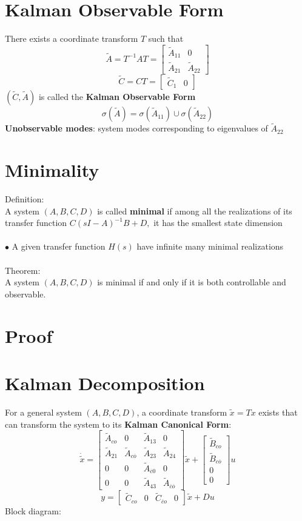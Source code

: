 \documentclass[10pt,a4paper,oneside]{article}
\begin{document}
\section{Kalman Observable Form}
There exists a coordinate transform $T$ such that
\[
\tilde{A}=T^{-1} A T=\left[\begin{array}{cc}{\tilde{A}_{11}} & {0} \\ {\tilde{A}_{21}} & {\tilde{A}_{22}}\end{array}\right]
\]
\[
\tilde{C}={C T}=\left[\begin{array}{ll}{\tilde{C}_{1}} & {0}\end{array}\right]
\]
$(\tilde{C}, \tilde{A})$ is called the {\bfseries Kalman Observable Form}
\[
\sigma(\tilde{A})=\sigma(\tilde{A}_{11}) \cup \sigma(\tilde{A}_{22})
\]
{\bfseries Unobservable modes}: system modes corresponding to eigenvalues of $\tilde{A}_{22}$
\section{Minimality}
Definition:\\
A system $(A,B,C,D)$ is called {\bfseries minimal} if among all the realizations of its transfer function $C(sI-A)^{-1} B+D,$ it has the smallest state dimension\\
\\$\bullet$ A given transfer function $H(s)$ have infinite many minimal realizations\\
\\Theorem:\\
A system $(A,B,C,D)$ is minimal if and only if it is both controllable and observable.
\section{Proof}
\section{Kalman Decomposition}
For a general system $(A,B,C,D)$, a coordinate transform $\tilde{x}=Tx$ exists that can transform the system to its {\bfseries Kalman Canonical Form}:
\[\dot{\tilde{x}}=\left[\begin{array}{cccc}{\tilde{A}_{co}} & {0} & {\tilde{A}_{13}} & {0} \\ {\tilde{A}_{21}} & {\tilde{A}_{c \overline{o}}} & {\tilde{A}_{23}} & {\tilde{A}_{24}} \\ {0} & {0} & {\tilde{A}_{\overline{c} 0}} & {0} \\ {0} & {0} & {\tilde{A}_{43}} & {\tilde{A}_{\overline{c} \overline{o}}}\end{array}\right]\tilde{x}+\left[\begin{array}{c}{\tilde{B}_{c o}} \\ {\tilde{B}_{c \overline{o}}} \\ {0} \\ {0}\end{array}\right]u\]
\[
y=\left[\begin{array}{cccc}
{\tilde{C}_{co}} & {0} & {\tilde{C}_{\overline{c}o}}&{0}\end{array}\right]\tilde{x}+Du
\]
Block diagram:
\end{document}
